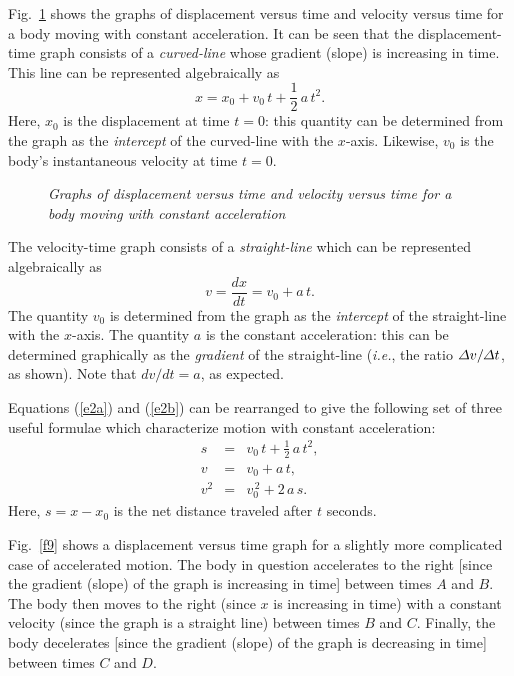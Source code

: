 Fig.~\ref{f8} shows the graphs of displacement versus time and
velocity versus time for a body
moving with constant acceleration. It can be seen that the displacement-time graph consists of
a {\em curved-line} whose gradient (slope) is increasing in time. 
This line can be represented algebraically as
\begin{equation}\label{e2a}
x = x_0 + v_0\,t + \frac{1}{2}\,a\,t^2.
\end{equation}
Here, $x_0$ is the displacement at time $t=0$: this quantity can be  determined from the
graph as the {\em intercept} of the
curved-line with the $x$-axis. Likewise, $v_0$ is the body's instantaneous
velocity at time $t=0$. 

\begin{figure}
\centerline{}
\caption{\em Graphs of displacement versus time and velocity versus time
for a body moving with constant acceleration}\label{f8}   
\end{figure}

The velocity-time graph consists of a {\em straight-line} which can be represented
algebraically as
\begin{equation}\label{e2b}
v = \frac{dx}{dt}= v_0 + a\,t.
\end{equation}
The quantity $v_0$ is determined from the graph as the  {\em intercept} of the
straight-line with the $x$-axis. The quantity $a$ is the constant acceleration: this 
 can be determined  graphically as the {\em gradient} of the straight-line
({\em i.e.}, the ratio ${\mit\Delta}v/{\mit\Delta} t$, as shown). Note that
$dv/dt=a$, as expected.

Equations (\ref{e2a}) and (\ref{e2b}) can be rearranged to give the
following set of three useful formulae which characterize motion with
constant acceleration:
\begin{eqnarray}
s &=& v_0\,t + \frac{1}{2} \,a\,t^2,\label{e211}\\
v  &=& v_0 + a\,t,\\
v^2 &=& v_0^{\,2} + 2\,a\,s.\label{e214}
\end{eqnarray}
Here, $s=x-x_0$ is the net distance traveled after $t$ seconds.

Fig.~\ref{f9} shows a  displacement versus time graph for a slightly  more
complicated case of accelerated motion. The body in question accelerates
to the right [since the gradient (slope) of the graph is increasing in time] 
 between times $A$ and $B$. The body then moves to
the right (since $x$ is  increasing in time) with a  constant velocity
(since the graph is a straight line) between times
$B$ and $C$. 
Finally, the body decelerates [since the gradient (slope) of the graph is decreasing in time]
 between times $C$ and $D$.

